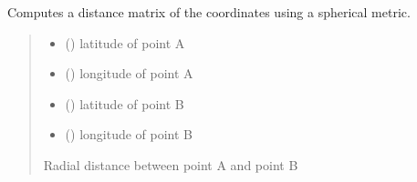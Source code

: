 \documentclass[letterpaper,10pt,english]{sphinxmanual}
\begin{document}

\begin{fulllineitems}
\label{\detokenize{misc:glomar_gridding.distances.radial_dist}}
\pysigstartsignatures
\pysiglinewithargsret
{}
{\sphinxparamcomma {}\sphinxparamcomma {}\sphinxparamcomma {}}
{}
\pysigstopsignatures
\sphinxAtStartPar
Computes a distance matrix of the coordinates using a spherical metric.
\begin{quote}\begin{description}
\begin{itemize}
\item {}
\sphinxAtStartPar
{} () \textendash{} latitude of point A

\item {}
\sphinxAtStartPar
{} () \textendash{} longitude of point A

\item {}
\sphinxAtStartPar
{} () \textendash{} latitude of point B

\item {}
\sphinxAtStartPar
{} () \textendash{} longitude of point B

\end{itemize}

\sphinxAtStartPar
Radial distance between point A and point B

\end{description}\end{quote}

\end{fulllineitems}

\end{document}
